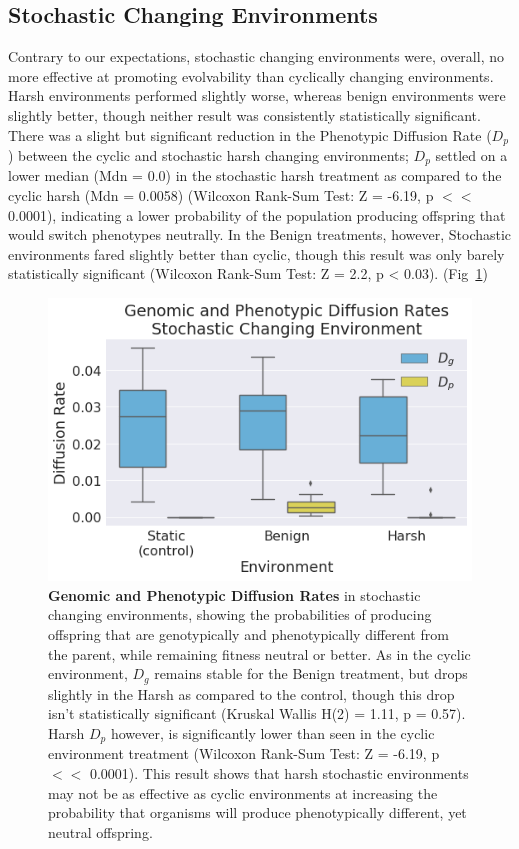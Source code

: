 \documentclass[PhD]{msu-thesis}
\begin{document}
\subsection{Stochastic Changing Environments}
Contrary to our expectations, stochastic changing environments were, overall, no more effective at
promoting evolvability than cyclically changing environments. Harsh environments performed slightly worse, whereas benign environments were slightly better, though neither result was consistently statistically significant. There was a slight but significant reduction in the Phenotypic Diffusion Rate ($D_p$) between the cyclic and stochastic harsh changing environments; $D_p$ settled on a lower median (Mdn = 0.0) in the stochastic harsh treatment as compared to the cyclic harsh (Mdn = 0.0058) (Wilcoxon Rank-Sum Test: Z = -6.19, p $<<$ 0.0001), indicating a lower probability of the population producing offspring that would switch phenotypes neutrally. In the Benign treatments, however, Stochastic environments fared slightly better than cyclic, though this result was only barely statistically significant (Wilcoxon Rank-Sum Test: Z = 2.2, p < 0.03). (Fig~\ref{fig:CSE_diffusion_rate}) 

	\begin{figure}[!h] %
	\includegraphics[trim={0.2cm 0 0.4cm 0.25cm},clip,width=0.75\columnwidth]{figures/CE/CSE_D_g_D_p__box.png}
	\caption{\textbf{Genomic and Phenotypic Diffusion Rates} in stochastic changing environments, showing the probabilities of producing offspring that are genotypically and phenotypically different from the parent, while remaining fitness neutral or better. As in the cyclic environment, $D_g$ remains stable for the Benign treatment, but drops slightly in the Harsh as compared to the control, though this drop isn't statistically significant (Kruskal Wallis H(2) = 1.11, p = 0.57). Harsh $D_p$ however, is significantly lower than seen in the cyclic environment treatment (Wilcoxon Rank-Sum Test: Z = -6.19, p $<<$ 0.0001). This result shows that harsh stochastic environments may not be as effective as cyclic environments at increasing the probability that organisms will produce phenotypically different, yet neutral offspring.
	}\label{fig:CSE_diffusion_rate}
	\end{figure}
\end{document}

